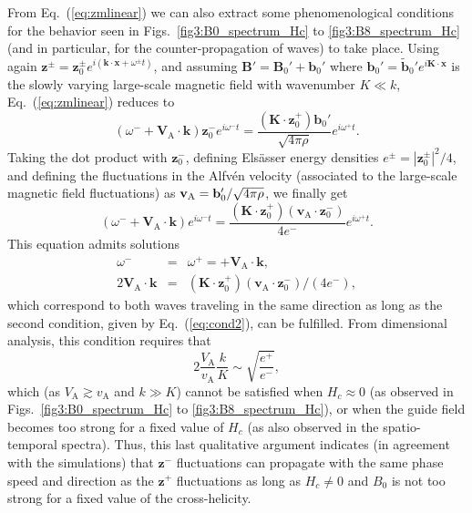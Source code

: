 \documentclass[aip,pop,reprint,amsmath,amssymb,floatfix]{revtex4-1}
\renewcommand{\vec}[1]{\mathbf{#1}}
\begin{document}
From Eq.~(\ref{eq:zmlinear}) we can also extract some phenomenological conditions for the behavior seen in Figs.~\ref{fig3:B0_spectrum_Hc} to \ref{fig3:B8_spectrum_Hc} (and in particular, for the counter-propagation of waves) to take place. Using again $\vec{z}^\pm = \vec{z}_0^\pm e^{i(\vec{k}\cdot \vec{x}+\omega^\pm t)}$, and assuming $\vec{B}' = \vec{B}_0' + \vec{b}_0'$ where $\vec{b}_0' = \vec{\tilde{b}}_0'e^{i\vec{K} \cdot \vec{x}}$ is the slowly varying large-scale magnetic field with wavenumber $K \ll k$, Eq.~(\ref{eq:zmlinear}) reduces to
\begin{equation}
\left( \omega^- +\vec{V}_\textrm{A} \cdot \vec{k} \right) 
    \vec{z}_0^- e^{i \omega^- t} = 
    \frac{\left(\vec{K} \cdot \vec{z}_0^+\right) \vec{b}_0'}{\sqrt{4\pi \rho}} 
    e^{i \omega^+ t} .
\end{equation}
Taking the dot product with $\vec{z}_0^-$, defining Els\"asser energy densities $e^\pm = |\vec{z}_0^\pm|^2/4$, and defining the fluctuations in the Alfv\'en velocity (associated to the large-scale magnetic field fluctuations) as ${\bf v}_\textrm{A} = \vec{b}_0'/\sqrt{4\pi \rho}$, we finally get
\begin{equation}
\left( \omega^- + \vec{V}_\textrm{A} \cdot \vec{k} \right)
    e^{i \omega^- t} = 
    \frac{\left(\vec{K} \cdot \vec{z}_0^+\right)
    \left(\vec{v}_\textrm{A} \cdot \vec{z}_0^-\right)}
    {4e^-} 
    e^{i \omega^+ t} .
\end{equation}
This equation admits solutions
\begin{eqnarray}
    \omega^- &=& \omega^+ =
    + \vec{V}_\textrm{A} \cdot \vec{k}, 
    \label{eq:cond1} \\
    2 \vec{V}_\textrm{A} \cdot \vec{k} &=& 
    \left(\vec{K} \cdot \vec{z}_0^+\right)
    \left(\vec{v}_\textrm{A} \cdot \vec{z}_0^-\right) /
    (4e^-), \label{eq:cond2}
\end{eqnarray}
which correspond to both waves traveling in the same direction as long as the second condition, given by Eq.~(\ref{eq:cond2}), can be fulfilled. From dimensional analysis, this condition requires that
\begin{equation}
    2 \frac{V_\textrm{A}}{v_\textrm{A}} \frac{k}{K}
    \sim \sqrt{\frac{e^+}{e^-}},
\end{equation}
which (as $V_\textrm{A}\gtrsim v_\textrm{A}$ and $k\gg K$) cannot be satisfied when $H_c \approx 0$ (as observed in Figs.~\ref{fig3:B0_spectrum_Hc} to \ref{fig3:B8_spectrum_Hc}), or when the guide field becomes too strong for a fixed value of $H_c$ (as also observed in the spatio-temporal spectra). Thus, this last qualitative argument indicates (in agreement with the simulations) that $\vec{z}^-$ fluctuations can propagate with the same phase speed and direction as the $\vec{z}^+$ fluctuations as long as $H_c \neq 0$ and $B_0$ is not too strong for a fixed value of the cross-helicity.
\end{document}

